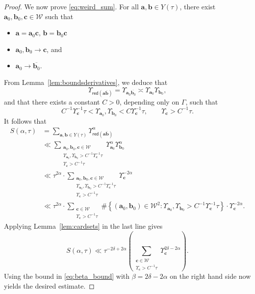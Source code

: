 \documentclass[12pt,letterpaper]{amsart}
\theoremstyle{plain}
\theoremstyle{definition}
\theoremstyle{remark}
\newcommand{\Aa}{\textbf{a}}
\newcommand{\Bb}{\textbf{b}}
\newcommand{\Cc}{\textbf{c}}
\begin{document}
\begin{proof}
We now prove \eqref{eq:weird_sum}. For all $\Aa, \Bb \in Y(\tau)$, there exist $\Aa_0, \Bb_0 , \Cc \in \mathcal{W}$ such that
\begin{itemize}
  \item $ \Aa = \Aa_0 \Cc,\, \Bb = \Bb_0 \Cc $
  \item $\Aa_0, \Bb_0 \to \Cc$, and
  \item $\Aa_0 \to \overline{\Bb_0}$.
\end{itemize}
From Lemma~\ref{lem:boundsderivatives}, we deduce that
\[
\Upsilon_{\mathsf{red}(\Aa\overline{\Bb})} = \Upsilon_{\Aa_0\overline{\Bb_0}} \asymp \Upsilon_{\Aa_0} \Upsilon_{\Bb_0},
\]
and that there exists a constant $C > 0$, depending only on $\Gamma$, such that
\[
C^{-1} \Upsilon_{\Cc}^{-1} \tau < \Upsilon_{\Aa_0}, \Upsilon_{\Bb_0} < C \Upsilon_{\Cc}^{-1} \tau, \qquad \Upsilon_{\Cc} > C^{-1} \tau.
\]
It follows that
\begin{align*}
S(\alpha, \tau) &= \sum_{\Aa,\Bb \in Y(\tau)} \Upsilon_{\mathsf{red}(\Aa\overline{\Bb})}^{\alpha}\\ 
&\ll \sum_{\substack{\Aa_0,\Bb_0,\Cc \in \mathcal{W} \\ \Upsilon_{\Aa_0}, \Upsilon_{\Bb_0} > C^{-1} \Upsilon_{\Cc}^{-1} \tau \\ \Upsilon_{\Cc} > C^{-1} \tau}} \Upsilon_{\Aa_0}^{\alpha} \Upsilon_{\Bb_0}^{\alpha} \\
&\ll \tau^{2\alpha} \cdot \sum_{\substack{\Aa_0,\Bb_0,\Cc \in \mathcal{W} \\ \Upsilon_{\Aa_0}, \Upsilon_{\Bb_0} > C^{-1} \Upsilon_{\Cc}^{-1} \tau \\ \Upsilon_{\Cc} > C^{-1} \tau}} \Upsilon_{\Cc}^{-2\alpha} \\
&\ll \tau^{2\alpha} \cdot \sum_{\substack{\Cc\in \mathcal{W} \\ \Upsilon_{\Cc} > C^{-1} \tau}} \#\left\{ (\Aa_0,\Bb_0) \in \mathcal{W}^2 : \Upsilon_{\Aa_0}, \Upsilon_{\Bb_0} > C^{-1} \Upsilon_{\Cc}^{-1} \tau \right\} \cdot \Upsilon_{\Cc}^{-2\alpha}.
\end{align*}
Applying Lemma~\ref{lem:cardsets} in the last line gives
$$
S(\alpha, \tau) \ll \tau^{-2\delta + 2\alpha} \left(  \sum_{\substack{\Cc \in \mathcal{W}\\ \Upsilon_{\Cc} > C^{-1} \tau}} \Upsilon_{\Cc}^{2\delta - 2\alpha}\right).
$$
Using the bound in \eqref{eq:beta_bound} with $\beta = 2\delta - 2\alpha$ on the right hand side now yields the desired estimate.
\end{proof}
\end{document}
